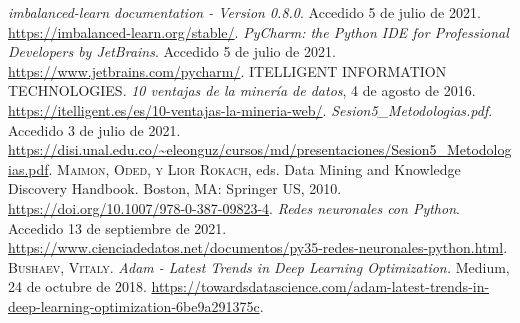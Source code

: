 \begin{thebibliography}{a}
	 \textit{imbalanced-learn documentation - Version 0.8.0}. Accedido 5 de julio de 2021. \url{https://imbalanced-learn.org/stable/}.
	 \textit{PyCharm: the Python IDE for Professional Developers by JetBrains}. Accedido 5 de julio de 2021. \url{https://www.jetbrains.com/pycharm/}.
	 \textsc{ITELLIGENT INFORMATION TECHNOLOGIES}. \textit{10 ventajas de la miner\'{i}a de datos}, 4 de agosto de 2016. \url{https://itelligent.es/es/10-ventajas-la-mineria-web/}.
	 \textit{Sesion5\_Metodologias.pdf}. Accedido 3 de julio de 2021. \url{https://disi.unal.edu.co/~eleonguz/cursos/md/presentaciones/Sesion5\_Metodologias.pdf}.
	 \textsc{Maimon, Oded, y Lior Rokach}, eds. Data Mining and Knowledge Discovery Handbook. Boston, MA: Springer US, 2010. \url{https://doi.org/10.1007/978-0-387-09823-4}.
	 \textit{Redes neuronales con Python}. Accedido 13 de septiembre de 2021. \url{https://www.cienciadedatos.net/documentos/py35-redes-neuronales-python.html}.
	 \textsc{Bushaev, Vitaly}. \textit{Adam - Latest Trends in Deep Learning Optimization.} Medium, 24 de octubre de 2018. \url{https://towardsdatascience.com/adam-latest-trends-in-deep-learning-optimization-6be9a291375c}.
\end{thebibliography}
